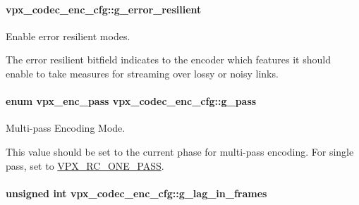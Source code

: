 \paragraph[{\texorpdfstring{g\+\_\+error\+\_\+resilient}{g_error_resilient}}]{ vpx\+\_\+codec\+\_\+enc\+\_\+cfg\+::g\+\_\+error\+\_\+resilient}\hypertarget{structvpx__codec__enc__cfg_a4e17173b66ca0d7dfba9978625d7ba76}{}\label{structvpx__codec__enc__cfg_a4e17173b66ca0d7dfba9978625d7ba76}


Enable error resilient modes. 

The error resilient bitfield indicates to the encoder which features it should enable to take measures for streaming over lossy or noisy links. 
\paragraph[{\texorpdfstring{g\+\_\+pass}{g_pass}}]{\setlength{\rightskip}{0pt plus 5cm}enum {\bf vpx\+\_\+enc\+\_\+pass} vpx\+\_\+codec\+\_\+enc\+\_\+cfg\+::g\+\_\+pass}\hypertarget{structvpx__codec__enc__cfg_a70d62d87aae7d1168746577f14a6dccf}{}\label{structvpx__codec__enc__cfg_a70d62d87aae7d1168746577f14a6dccf}


Multi-\/pass Encoding Mode. 

This value should be set to the current phase for multi-\/pass encoding. For single pass, set to \hyperlink{group__encoder_gga476c5417f9c15a1dc5d3f68fa44c493fa7b6943a41868e8e26a77e9500f139ca1}{V\+P\+X\+\_\+\+R\+C\+\_\+\+O\+N\+E\+\_\+\+P\+A\+SS}. 
\paragraph[{\texorpdfstring{g\+\_\+lag\+\_\+in\+\_\+frames}{g_lag_in_frames}}]{\setlength{\rightskip}{0pt plus 5cm}unsigned int vpx\+\_\+codec\+\_\+enc\+\_\+cfg\+::g\+\_\+lag\+\_\+in\+\_\+frames}\hypertarget{structvpx__codec__enc__cfg_a992668d9e30305f3f7ab2672ea31a890}{}\label{structvpx__codec__enc__cfg_a992668d9e30305f3f7ab2672ea31a890}



